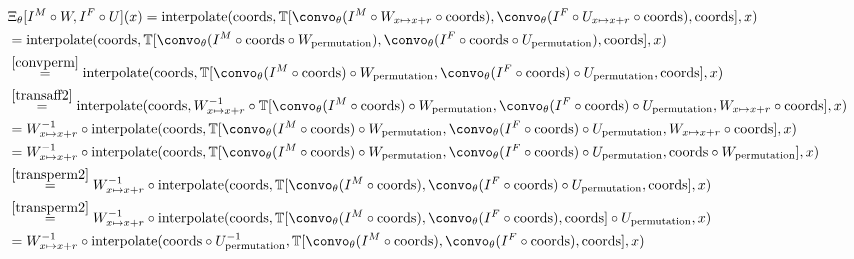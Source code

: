 \begin{equation}
	\begin{split}
		& \Xi_\theta[ I^M \circ W, I^F \circ U](x)  =\text{interpolate}(\text{coords}, \mathbb{T}[\convo_\theta (I^M \circ W_{x \mapsto x + r} \circ \text{coords}) , \convo_\theta(I^F \circ U_{x \mapsto x + r} \circ \text{coords}), \text{coords}], x)          \\
        &=\text{interpolate}(\text{coords}, \mathbb{T}[\convo_\theta (I^M \circ \text{coords} \circ W_{\text{permutation}}) , \convo_\theta(I^F \circ \text{coords} \circ U_{\text{permutation}}), \text{coords}], x)          \\
		& \stackrel{\eqref{convperm}}{=} \text{interpolate}(\text{coords}, \mathbb{T}[\convo_\theta (I^M \circ \text{coords}) \circ W_{\text{permutation}} , \convo_\theta(I^F \circ \text{coords}) \circ U_{\text{permutation}}, \text{coords}], x)\\
		& \stackrel{\eqref{transaff2}}{=} \text{interpolate}(\text{coords}, W_{x \mapsto x + r}^{-1} \circ \mathbb{T}[\convo_\theta (I^M\circ \text{coords}) \circ W_{\text{permutation}}, \convo_\theta(I^F\circ \text{coords}) \circ U_{\text{permutation}}, W_{x \mapsto x + r} \circ \text{coords}], x) \\
		&= W_{x \mapsto x + r}^{-1} \circ \text{interpolate}(\text{coords}, \mathbb{T}[\convo_\theta (I^M\circ \text{coords}) \circ W_{\text{permutation}}, \convo_\theta(I^F\circ \text{coords}) \circ U_{\text{permutation}}, W_{x \mapsto x + r} \circ \text{coords}], x) \\
		& = W_{x \mapsto x + r}^{-1} \circ \text{interpolate}(\text{coords},  \mathbb{T}[\convo_\theta (I^M\circ \text{coords}) \circ W_{\text{permutation}}, \convo_\theta(I^F\circ \text{coords}) \circ U_{\text{permutation}}, \text{coords} \circ W_{\text{permutation}}] , x) \\
        & \stackrel{\eqref{transperm2}}{=} W_{x \mapsto x + r}^{-1} \circ \text{interpolate}(\text{coords},  \mathbb{T}[\convo_\theta (I^M\circ \text{coords}), \convo_\theta(I^F\circ \text{coords}) \circ U_{\text{permutation}}, \text{coords} ] , x) \\
        & \stackrel{\eqref{transperm2}}{=} W_{x \mapsto x + r}^{-1} \circ \text{interpolate}(\text{coords},  \mathbb{T}[\convo_\theta (I^M\circ \text{coords}), \convo_\theta(I^F\circ \text{coords}), \text{coords} ] \circ U_\text{permutation}, x) \\
        & = W_{x \mapsto x + r}^{-1} \circ \text{interpolate}(\text{coords} \circ U^{-1}_\text{permutation},  \mathbb{T}[\convo_\theta (I^M\circ \text{coords}), \convo_\theta(I^F\circ \text{coords}), \text{coords} ], x) \\

\end{split}
\end{equation}
